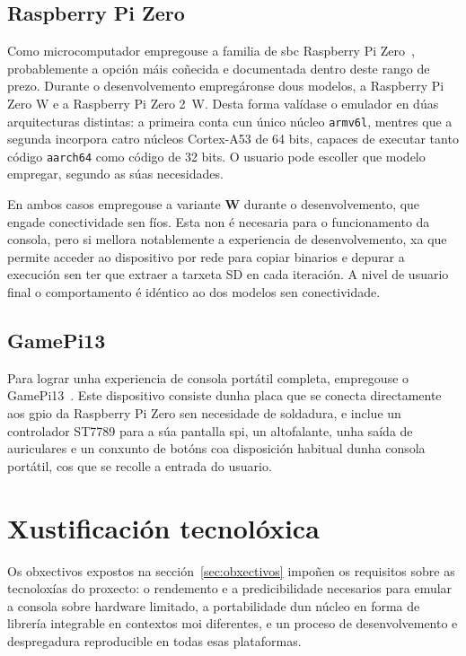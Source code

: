 \subsection{Raspberry Pi Zero}
Como microcomputador empregouse a familia de \acrshort{sbc} Raspberry Pi Zero~\cite{RaspberryPiZero},
probablemente a opción máis coñecida e documentada dentro deste rango de prezo.
Durante o desenvolvemento empregáronse dous modelos, a Raspberry Pi Zero W e a Raspberry Pi Zero 2~W.
Desta forma valídase o emulador en dúas arquitecturas distintas:
a primeira conta cun único núcleo \texttt{armv6l},
mentres que a segunda incorpora catro núcleos Cortex-A53 de 64 bits,
capaces de executar tanto código \texttt{aarch64} como código de 32 bits.
O usuario pode escoller que modelo empregar, segundo as súas necesidades.

En ambos casos empregouse a variante \textbf{W} durante o desenvolvemento, que engade conectividade sen fíos.
Esta non é necesaria para o funcionamento da consola,
pero si mellora notablemente a experiencia de desenvolvemento,
xa que permite acceder ao dispositivo por rede para copiar binarios e depurar a execución
sen ter que extraer a tarxeta SD en cada iteración.
A nivel de usuario final o comportamento é idéntico ao dos modelos sen conectividade.

\subsection{GamePi13}

Para lograr unha experiencia de consola portátil completa, empregouse o GamePi13~\cite{GamePi13}.
Este dispositivo consiste dunha placa que se conecta directamente aos \acrshort{gpio} da Raspberry Pi Zero sen necesidade de soldadura,
e inclue un controlador ST7789 para a súa pantalla \acrshort{spi}, un altofalante, unha saída de auriculares
e un conxunto de botóns coa disposición habitual dunha consola portátil, cos que se recolle a entrada do usuario.


\section{Xustificación tecnolóxica}
Os obxectivos expostos na sección~\ref{sec:obxectivos} impoñen os requisitos 
sobre as tecnoloxías do proxecto:
o rendemento e a predicibilidade necesarios para emular a consola sobre hardware limitado,
a portabilidade dun núcleo en forma de librería integrable en contextos moi diferentes,
e un proceso de desenvolvemento e despregadura reproducible en todas esas plataformas.

